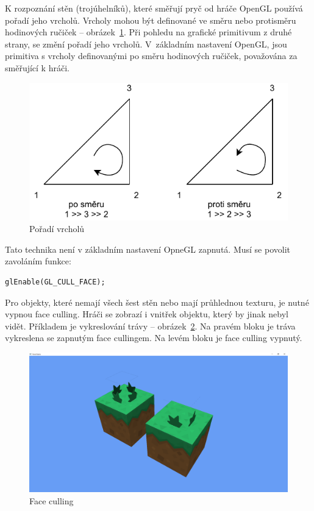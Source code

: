 \documentclass[thesis=M,czech]{FITthesis}[2019/12/23]
\begin{document}
K rozpoznání stěn (trojúhelníků), které směřují pryč od hráče OpenGL používá pořadí jeho vrcholů. Vrcholy mohou být definované ve směru nebo protisměru hodinových ručiček  -- obrázek~\ref{fig:winding_order}. Při pohledu na grafické primitivum z druhé strany, se změní pořadí jeho vrcholů. V~základním nastavení OpenGL, jsou primitiva s vrcholy definovanými po směru hodinových ručiček, považována za směřující k hráči.

\begin{figure}\centering
	\includegraphics[width=\textwidth]{images/winding_order}
	\caption[Pořadí vrcholů]{Pořadí vrcholů}\label{fig:winding_order}
\end{figure}

Tato technika není v základním nastavení OpneGL zapnutá. Musí se povolit zavoláním funkce:

\begin{verbatim}
glEnable(GL_CULL_FACE);
\end{verbatim}

Pro objekty, které nemají všech šest stěn nebo mají průhlednou texturu, je nutné vypnou face culling. Hráči se zobrazí i vnitřek objektu, který by jinak nebyl vidět. Příkladem je vykreslování trávy -- obrázek~\ref{fig:face_culling}. Na pravém bloku je tráva vykreslena se zapnutým face cullingem. Na levém bloku je face culling vypnutý.

\begin{figure}\centering
	\includegraphics[width=\textwidth]{images/face_culling}
	\caption[Face culling]{Face culling}\label{fig:face_culling}
\end{figure}
\end{document}

